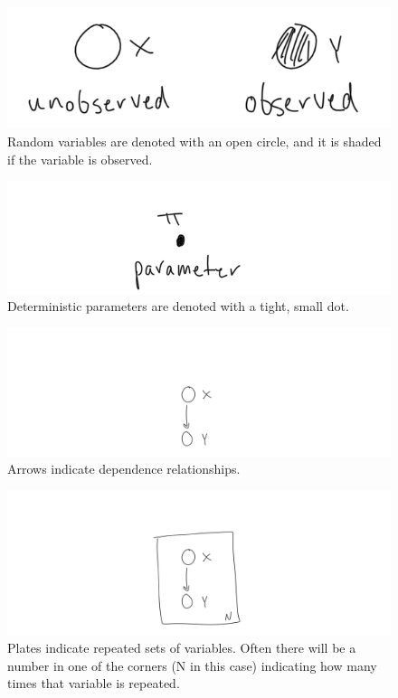 \begin{figure}
    \centering
    \includegraphics[width=0.5\paperwidth]{../GraphicalModels/fig/RandomVar.png}
    \caption{Random variables are denoted with an open circle, and it is shaded if the variable is observed.}
    \label{fig:random-var}
\end{figure}
\begin{figure}
    \centering
    \includegraphics[width=0.5\paperwidth]{../GraphicalModels/fig/DeterministicParam.png}
    \caption{Deterministic parameters are denoted with a tight, small dot.}
    \label{fig:deterministic-param}
\end{figure}
\begin{figure}
    \centering
    \includegraphics[width=0.7\paperwidth]{../GraphicalModels/fig/arrows.png}
    \caption{Arrows indicate dependence relationships.}
    \label{fig:arrows}
\end{figure}
\begin{figure}
    \centering
    \includegraphics[width=0.7\paperwidth]{../GraphicalModels/fig/plates.png}
    \caption{Plates indicate repeated sets of variables. Often there will be a number in one of the corners (N in this case) indicating how many times that variable is repeated.}
    \label{fig:plates}
\end{figure}

